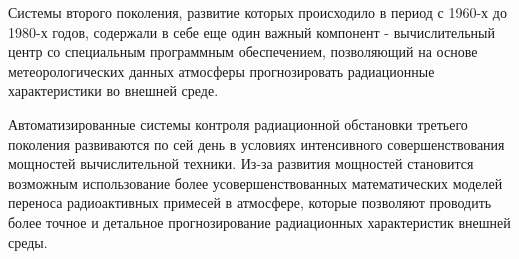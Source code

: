 Системы второго поколения, развитие которых происходило в период с 1960-х до 1980-х годов, содержали в себе еще один 
важный компонент - вычислительный центр со специальным программным обеспечением, позволяющий на основе метеорологических 
данных атмосферы прогнозировать радиационные характеристики во внешней среде. 

Автоматизированные системы контроля радиационной обстановки третьего поколения развиваются по сей день в условиях 
интенсивного совершенствования мощностей вычислительной техники. Из-за развития мощностей становится возможным 
использование более усовершенствованных математических моделей переноса радиоактивных примесей в атмосфере, которые 
позволяют проводить более точное и детальное прогнозирование радиационных характеристик внешней среды.